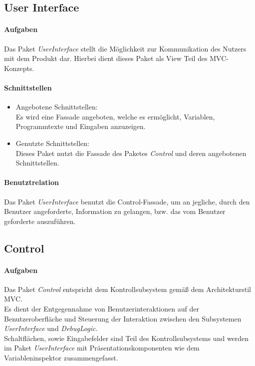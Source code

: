 \documentclass[parskip=full]{scrartcl}
\begin{document}
\newpage

\subsection{User Interface}
\paragraph{Aufgaben} Das Paket \textit{UserInterface} stellt die Möglichkeit zur Kommunikation des Nutzers mit dem Produkt dar. Hierbei dient dieses Paket als View Teil des MVC-Konzepts.
\paragraph{Schnittstellen} 
\begin{itemize}
\item Angebotene Schnittstellen:\\
Es wird eine Fassade angeboten, welche es ermöglicht, Variablen, Programmtexte und Eingaben anzuzeigen.
\item Genutzte Schnittstellen:\\
Dieses Paket nutzt die Fassade des Paketes \textit{Control} und deren angebotenen Schnittstellen.
\end{itemize}
\paragraph{Benutztrelation} Das Paket \textit{UserInterface} benutzt die Control-Fassade, um an jegliche, durch den Benutzer angeforderte, Information zu gelangen, bzw. das vom Benutzer geforderte auszuführen. %


\subsection{Control}
\paragraph{Aufgaben}
    Das Paket \textit{Control} entspricht dem Kontrollsubsystem gemäß dem Architekturstil MVC.\\
    Es dient der Entgegennahme von Benutzerinteraktionen auf der Benutzeroberfläche und Steuerung der Interaktion zwischen den
    Subsystemen \textit{UserInterface} und \textit{DebugLogic}.\\
    Schaltflächen, sowie Eingabefelder sind Teil des Kontrollsubsystems und werden im Paket 
    \textit{UserInterface} mit Präsentationskomponenten wie dem Variableninspektor zusammengefasst.\\
\end{document}
